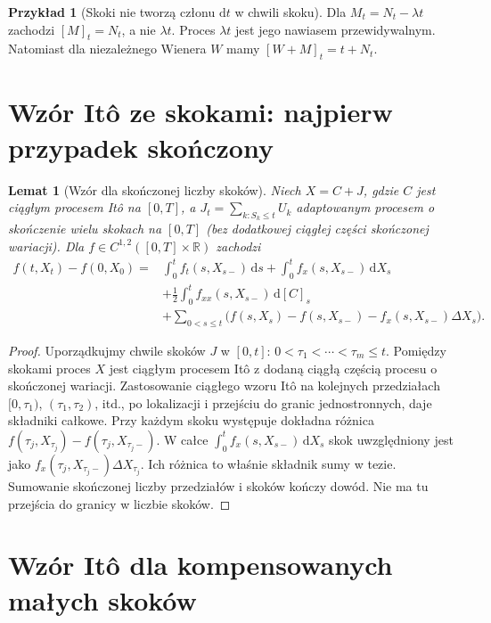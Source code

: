 \documentclass[11pt,a4paper,oneside]{report}
\numberwithin{equation}{chapter}
\theoremstyle{plain}
\newtheorem{lemat}[twierdzenie]{Lemat}
\theoremstyle{definition}
\newtheorem{przyklad}{Przykład}[chapter]
\theoremstyle{remark}
\newcommand{\R}{\mathbb{R}}
\newcommand{\dd}{\mathrm{d}}
\begin{document}
\begin{przyklad}[Skoki nie tworzą członu $\dd t$ w chwili skoku]
Dla $M_t=N_t-\lambda t$ zachodzi $[M]_t=N_t$,
a nie $\lambda t$. Proces $\lambda t$ jest jego nawiasem
przewidywalnym. Natomiast dla niezależnego Wienera
$W$ mamy $[W+M]_t=t+N_t$.
\end{przyklad}

\section{Wzór Itô ze skokami: najpierw przypadek skończony}\label{sec:volIII:12:04}

\begin{lemat}[Wzór dla skończonej liczby skoków]\label{lem:volIII:12:02}
\label{lem:finite-jump-ito}
Niech $X=C+J$, gdzie $C$ jest ciągłym procesem Itô
na $[0,T]$, a $J_t=\sum_{k:S_k\le t}U_k$ adaptowanym procesem
o skończenie wielu skokach na $[0,T]$ (bez dodatkowej
ciągłej części skończonej wariacji).
Dla $f\in C^{1,2}([0,T]\times\R)$ zachodzi
\[
\begin{split}
f(t,X_t)-f(0,X_0)={}&\int_0^t f_t(s,X_{s-})\,\dd s
+\int_0^t f_x(s,X_{s-})\,\dd X_s\\
&+\frac12\int_0^t f_{xx}(s,X_{s-})\,\dd[C]_s\\
&+\sum_{0<s\le t}\bigl(f(s,X_s)-f(s,X_{s-})
-f_x(s,X_{s-})\Delta X_s\bigr).
\end{split}
\tag{12.3}\label{eq:ito-finite-jumps}
\]
\end{lemat}
\begin{proof}
Uporządkujmy chwile skoków $J$ w $[0,t]$:
$0<\tau_1<\cdots<\tau_m\le t$. Pomiędzy skokami
proces $X$ jest ciągłym procesem Itô z dodaną
ciągłą częścią procesu o skończonej wariacji.
Zastosowanie ciągłego wzoru Itô na kolejnych przedziałach
$[0,\tau_1)$, $(\tau_1,\tau_2)$, itd., po lokalizacji i
przejściu do granic jednostronnych, daje składniki
całkowe. Przy każdym skoku występuje dokładna różnica
$f(\tau_j,X_{\tau_j})-f(\tau_j,X_{\tau_j-})$.
W całce $\int_0^t f_x(s,X_{s-})\,\dd X_s$ skok uwzględniony jest jako
$f_x(\tau_j,X_{\tau_j-})\Delta X_{\tau_j}$.
Ich różnica to właśnie składnik sumy w tezie.
Sumowanie skończonej liczby przedziałów i skoków
kończy dowód. Nie ma tu przejścia do granicy w liczbie skoków.
\end{proof}

\section{Wzór Itô dla kompensowanych małych skoków}\label{sec:volIII:12:05}
\end{document}
